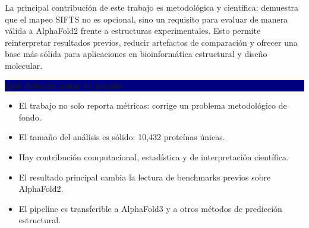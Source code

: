 \documentclass[12pt]{extarticle}
\newcommand{\sectionbar}[1]{%
  \vspace{0.8em}
  \noindent\colorbox{navy}{\parbox{\dimexpr\linewidth-2\fboxsep\relax}{\color{white}\bfseries #1}}
  \vspace{0.5em}
}
\begin{document}
La principal contribución de este trabajo es metodológica y científica: demuestra que el mapeo SIFTS no es opcional, sino un requisito para evaluar de manera válida a AlphaFold2 frente a estructuras experimentales. Esto permite reinterpretar resultados previos, reducir artefactos de comparación y ofrecer una base más sólida para aplicaciones en bioinformática estructural y diseño molecular.

\sectionbar{Qué debería notar el jurado}
\begin{itemize}
  \item El trabajo no solo reporta métricas: corrige un problema metodológico de fondo.
  \item El tamaño del análisis es sólido: 10,432 proteínas únicas.
  \item Hay contribución computacional, estadística y de interpretación científica.
  \item El resultado principal cambia la lectura de benchmarks previos sobre AlphaFold2.
  \item El pipeline es transferible a AlphaFold3 y a otros métodos de predicción estructural.
\end{itemize}
\end{document}
